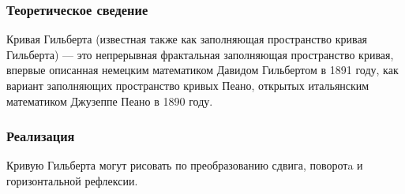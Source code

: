 \documentclass[12pt]{article} %
\begin{document}
\subsubsection{Теоретическое сведение}
\begin{figure}

\end{figure}
Кривая Гильберта (известная также как заполняющая пространство кривая Гильберта) — это непрерывная фрактальная заполняющая пространство кривая, впервые описанная немецким математиком Давидом Гильбертом в 1891 году, как вариант заполняющих пространство кривых Пеано, открытых итальянским математиком Джузеппе Пеано в 1890 году.


\subsubsection{Реализация}
Кривую Гильберта могут рисовать по преобразованию сдвига, поворотa и горизонтальной рефлексии. 
\end{document}
